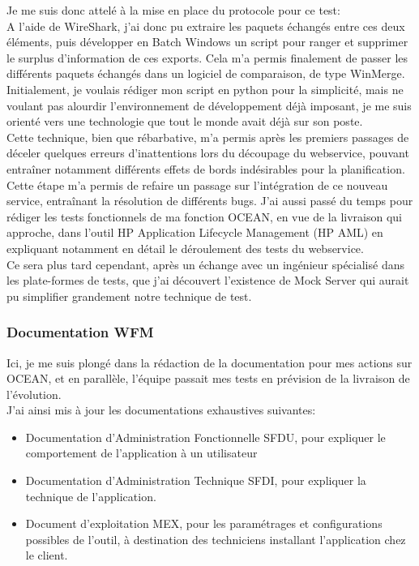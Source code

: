 \documentclass{rapport}
\begin{document}
Je me suis donc attelé à la mise en place du protocole pour ce test:\\
A l'aide de WireShark, j'ai donc pu extraire les paquets échangés entre ces deux éléments, puis développer en Batch Windows un script pour ranger et supprimer le surplus d'information de ces exports. Cela m'a permis finalement de passer les différents paquets échangés dans un logiciel de comparaison, de type WinMerge.\\
Initialement, je voulais rédiger mon script en python pour la simplicité, mais ne voulant pas alourdir l'environnement de développement déjà imposant, je me suis orienté vers une technologie que tout le monde avait déjà sur son poste.\\


Cette technique, bien que rébarbative, m'a permis après les premiers passages de déceler quelques erreurs d'inattentions lors du découpage du webservice, pouvant entraîner notamment différents effets de bords indésirables pour la planification.\\

Cette étape m'a permis de refaire un passage sur l'intégration de ce nouveau service, entraînant la résolution de différents bugs. J'ai aussi passé du temps pour rédiger les tests fonctionnels de ma fonction OCEAN, en vue de la livraison qui approche, dans l'outil HP Application Lifecycle Management (HP AML) en expliquant notamment en détail le déroulement des tests du webservice.\\

Ce sera plus tard cependant, après un échange avec un ingénieur spécialisé dans les plate-formes de tests, que j'ai découvert l'existence de Mock Server qui aurait pu simplifier grandement notre technique de test.

\subsubsection{Documentation WFM}

Ici, je me suis plongé dans la rédaction de la documentation pour mes actions sur OCEAN, et en  parallèle, l'équipe passait mes tests en prévision de la livraison de l'évolution.\\

J'ai ainsi mis à jour les documentations exhaustives suivantes:
    \begin{itemize}
        \item Documentation d'Administration Fonctionnelle SFDU, pour expliquer le comportement de l'application à un utilisateur
        \item Documentation d'Administration Technique SFDI, pour expliquer la technique de l'application.
        \item Document d'exploitation MEX, pour les paramétrages et configurations possibles de l'outil, à destination des techniciens installant l'application chez le client.
    \end{itemize}
\end{document}
